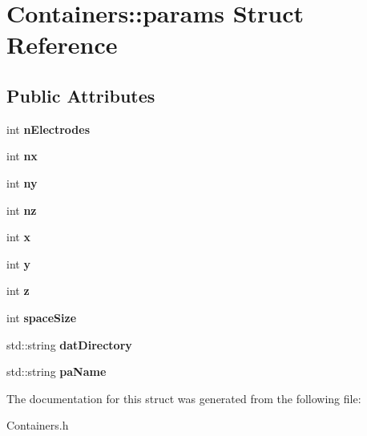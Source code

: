 \hypertarget{structContainers_1_1params}{\section{Containers\+:\+:params Struct Reference}
\label{structContainers_1_1params}
}
\subsection*{Public Attributes}
\begin{DoxyCompactItemize}
\item 
\hypertarget{structContainers_1_1params_abe8ccbd02af769cdcb56bb6f6cc6946b}{int {\bfseries n\+Electrodes}}\label{structContainers_1_1params_abe8ccbd02af769cdcb56bb6f6cc6946b}

\item 
\hypertarget{structContainers_1_1params_a6a6788908aea2259ca8098a9a18425fd}{int {\bfseries nx}}\label{structContainers_1_1params_a6a6788908aea2259ca8098a9a18425fd}

\item 
\hypertarget{structContainers_1_1params_a57181592b08274c35373c86cc16e15da}{int {\bfseries ny}}\label{structContainers_1_1params_a57181592b08274c35373c86cc16e15da}

\item 
\hypertarget{structContainers_1_1params_a17978e665404b4ee826fe4efcfc381ba}{int {\bfseries nz}}\label{structContainers_1_1params_a17978e665404b4ee826fe4efcfc381ba}

\item 
\hypertarget{structContainers_1_1params_a2c69282fbc8ff1e35b05f46d69914015}{int {\bfseries x}}\label{structContainers_1_1params_a2c69282fbc8ff1e35b05f46d69914015}

\item 
\hypertarget{structContainers_1_1params_a8c7268fae378e45c10964372ed505b2c}{int {\bfseries y}}\label{structContainers_1_1params_a8c7268fae378e45c10964372ed505b2c}

\item 
\hypertarget{structContainers_1_1params_aae5d2bb6656da7eb7d9ef176e7ae53a1}{int {\bfseries z}}\label{structContainers_1_1params_aae5d2bb6656da7eb7d9ef176e7ae53a1}

\item 
\hypertarget{structContainers_1_1params_a6749a304e90d5f3422ca3c4479bd9c81}{int {\bfseries space\+Size}}\label{structContainers_1_1params_a6749a304e90d5f3422ca3c4479bd9c81}

\item 
\hypertarget{structContainers_1_1params_a18b20bae8c5a6a7952386b75abdf9851}{std\+::string {\bfseries dat\+Directory}}\label{structContainers_1_1params_a18b20bae8c5a6a7952386b75abdf9851}

\item 
\hypertarget{structContainers_1_1params_ac4c602fa888df2405918118724d3518d}{std\+::string {\bfseries pa\+Name}}\label{structContainers_1_1params_ac4c602fa888df2405918118724d3518d}

\end{DoxyCompactItemize}


The documentation for this struct was generated from the following file\+:\begin{DoxyCompactItemize}
\item 
Containers.\+h\end{DoxyCompactItemize}
